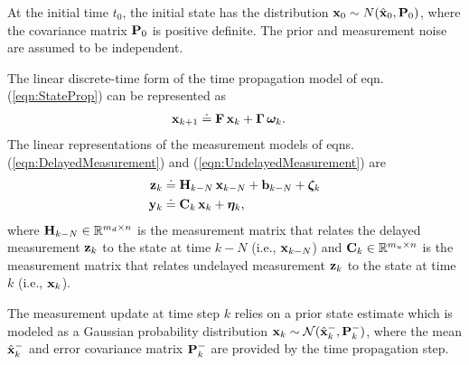 At the initial time $t_0$, the initial state has the distribution $\mathbf{x}_0\sim N(\hat{\mathbf{x}}_0,\mathbf{P}_0)$, where the covariance matrix $\mathbf{P}_0$ is positive definite.
The prior and measurement noise are assumed to be independent.

The linear discrete-time form of the time propagation model of eqn. (\ref{eqn:StateProp}) can be represented as
\begin{align}
	\label{eqn:LinearStateProp}
	\mathbf{x}_{k+1} &\doteq \mathbf{F} \, \mathbf{x}_k + \boldsymbol{\Gamma} \, \boldsymbol{\omega}_k.
\end{align}
The linear representations of the measurement models of eqns. (\ref{eqn:DelayedMeasurement}) and (\ref{eqn:UndelayedMeasurement}) are
\begin{align} \label{eqn:LinearDelayedMeasurement}
	\mathbf{z}_k &\doteq \mathbf{H}_{k-N} \, \mathbf{x}_{k-N} + \mathbf{b}_{k-N} +\boldsymbol{\zeta}_k \\
	\label{eqn:LinearUndelayedMeasurement}
	\mathbf{y}_k &\doteq \mathbf{C}_k \, \mathbf{x}_k + \boldsymbol{\eta}_k,
\end{align}
where $\mathbf{H}_{k-N} \in \mathbb{R}^{m_d \times n}$ is the measurement matrix that relates the delayed measurement $\mathbf{z}_{k}$ to the state at time $k-N$ (i.e., $\mathbf{x}_{k-N}$) and 
$\mathbf{C}_k\in \mathbb{R}^{m_u \times n}$ is the measurement matrix that relates undelayed measurement $\mathbf{z}_k$ to the state at time $k$ (i.e., $\mathbf{x}_k$).

The measurement update at time step $k$ relies on a  prior state estimate which is modeled as a Gaussian probability distribution $\mathbf{x}_k \sim \mathcal{N}(\hat{\mathbf{x}}_k^-,\mathbf{P}_k^-)$, where the mean $\hat{\mathbf{x}}_k^-$ and error covariance matrix $\mathbf{P}_k^-$ are provided by the time propagation step.

